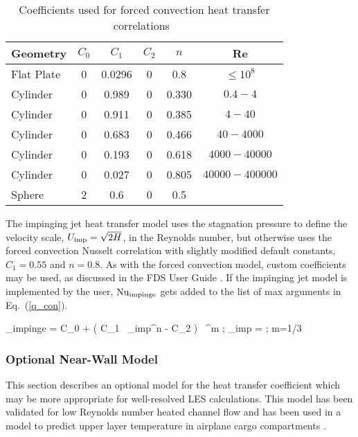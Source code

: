 \begin{table}[!ht]
\caption[Coefficients used for forced convection heat transfer correlations]{Coefficients used for forced convection heat transfer correlations~\cite{Incropera:1}}
\label{convective_heat_transfer_table}
\begin{center}
\begin{tabular}{|lccccc|}
\hline
Geometry     & $C_0$    & $C_1$   & $C_2$ & $n$    & Re             \\ \hline
Flat Plate   & 0        & 0.0296  & 0     & 0.8    & $\le 10^8$     \\
Cylinder     & 0        & 0.989   & 0     & 0.330  & $0.4-4$        \\
Cylinder     & 0        & 0.911   & 0     & 0.385  & $4-40$         \\
Cylinder     & 0        & 0.683   & 0     & 0.466  & $40-4000$      \\
Cylinder     & 0        & 0.193   & 0     & 0.618  & $4000-40000$   \\
Cylinder     & 0        & 0.027   & 0     & 0.805  & $40000-400000$ \\
Sphere       & 2        & 0.6     & 0     & 0.5    &                \\ \hline
\end{tabular}
\end{center}
\end{table}

The impinging jet heat transfer model uses the stagnation pressure to define the velocity scale, $U_{\rm imp} = \sqrt{2 H}$, in the Reynolds number, but otherwise uses the forced convection Nusselt correlation with slightly modified default constants, $C_1 = 0.55$ and $n=0.8$.  As with the forced convection model, custom coefficients may be used, as discussed in the FDS User Guide \cite{FDS_Users_Guide}.  If the impinging jet model is implemented by the user, $\hbox{Nu}_{\rm impinge}$ gets added to the list of max arguments in Eq.~(\ref{q_con}).

\be
   \NU_{\rm impinge} = C_0 + \left( C_1 \, \RE_{\rm imp}^n - C_2 \right) \, \PR^m  \quad ; \quad \RE_{\rm imp} =   \quad ; \quad m=1/3
\ee


\subsubsection{Optional Near-Wall Model}
\label{conflux_wall_model}

This section describes an optional model for the heat transfer coefficient which may be more appropriate for well-resolved LES calculations.  This model has been validated for low Reynolds number heated channel flow \cite{Park:2012} and has been used in a model to predict upper layer temperature in airplane cargo compartments \cite{Oztekin:FM2012}.

